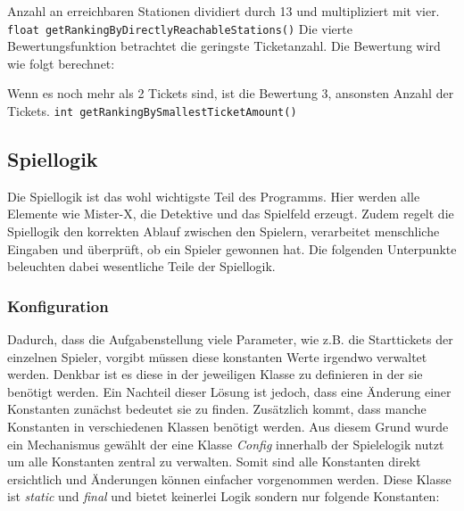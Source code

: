                     Anzahl an erreichbaren Stationen dividiert durch 13 und multipliziert mit vier.
                    \newline
                    \newline
                    \texttt{float getRankingByDirectlyReachableStations()}
                    \newline
                    \newline
                    Die vierte Bewertungsfunktion betrachtet die geringste Ticketanzahl.
                    Die Bewertung wird wie folgt berechnet:

                    Wenn es noch mehr als 2 Tickets sind, ist die Bewertung 3, ansonsten Anzahl der Tickets.
                    \newline
                    \newline
                    \texttt{int getRankingBySmallestTicketAmount()}
                    \newline
                    \newline
     
        \subsection{Spiellogik}\label{logic}
            Die Spiellogik ist das wohl wichtigste Teil des Programms.
            Hier werden alle Elemente wie Mister-X, die Detektive und das Spielfeld erzeugt.
            Zudem regelt die Spiellogik den korrekten Ablauf zwischen den Spielern, verarbeitet menschliche Eingaben
            und überprüft, ob ein Spieler gewonnen hat.
            Die folgenden Unterpunkte beleuchten dabei wesentliche Teile der Spiellogik.

            \subsubsection{Konfiguration}
                Dadurch, dass die Aufgabenstellung viele Parameter, wie z.B. die Starttickets der einzelnen Spieler,
                vorgibt müssen diese konstanten Werte irgendwo verwaltet werden. 
                Denkbar ist es diese in der jeweiligen Klasse zu definieren in der sie benötigt werden.
                Ein Nachteil dieser Lösung ist jedoch, dass eine Änderung einer Konstanten zunächst bedeutet sie zu finden.
                Zusätzlich kommt, dass manche Konstanten in verschiedenen Klassen benötigt werden.
                Aus diesem Grund wurde ein Mechanismus gewählt der eine Klasse \textit{Config} innerhalb der Spielelogik
                nutzt um alle Konstanten zentral zu verwalten.
                Somit sind alle Konstanten direkt ersichtlich und Änderungen können einfacher vorgenommen werden.
                \newline
                Diese Klasse ist \textit{static} und \textit{final} und bietet keinerlei Logik sondern nur folgende Konstanten:
                
